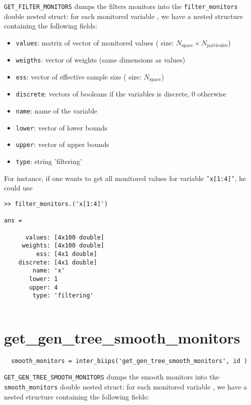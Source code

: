 \documentclass[11pt,twoside]{article}
\begin{document}
 \texttt{GET\_FILTER\_MONITORS} dumps the filters monitors into the \texttt{filter\_monitors} double nested struct: for each monitored variable , we have
  a nested structure containing the following fields:
  \begin{itemize}
   \item \texttt{values}: matrix of vector of monitored values ( size: $N_{\mbox{space}} \times N_{\mbox{particules}}$)
   \item \texttt{weigths}: vector of weights (same dimensions as values)
   \item \texttt{ess}: vector of effective  sample size ( size: $N_{\mbox{space}}$)
   \item \texttt{discrete}: vectors of booleans if the variables is discrete, 0 otherwise
   \item \texttt{name}: name of the variable
   \item \texttt{lower}: vector of lower bounds
   \item \texttt{upper}: vector of upper bounds
   \item \texttt{type}: string  'filtering'
   \end{itemize}

  For instance, if one wants to get all monitored values for variable \texttt{'x[1:4]'}, he could use
 \begin{lstlisting}
>> filter_monitors.('x[1:4]') 

ans = 

      values: [4x100 double]
     weights: [4x100 double]
         ess: [4x1 double]
    discrete: [4x1 double]
        name: 'x'
       lower: 1
       upper: 4
        type: 'filtering'
 
 \end{lstlisting}

 \section{get\_gen\_tree\_smooth\_monitors}
 
 \begin{lstlisting}
  smooth_monitors = inter_biips('get_gen_tree_smooth_monitors', id )
 \end{lstlisting}
 
 \texttt{GET\_GEN\_TREE\_SMOOTH\_MONITORS} dumps the smooth monitors into the \texttt{smooth\_monitors} double nested struct: for each monitored variable , we have
  a nested structure containing the following fields:
\end{document}
